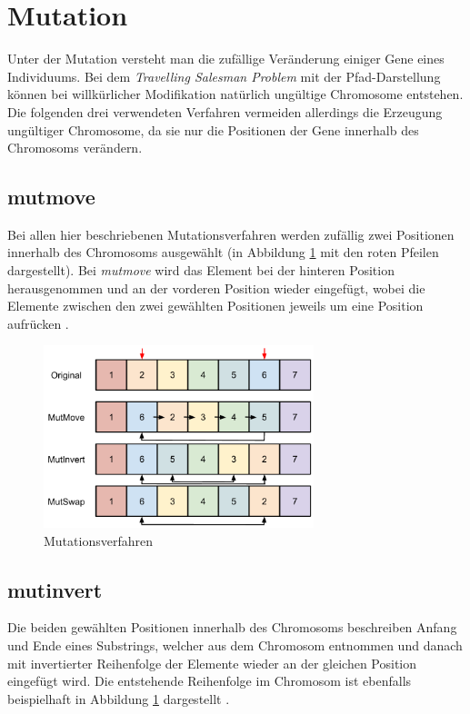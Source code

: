 \section{Mutation}\label{mutation}

Unter der Mutation versteht man die zufällige Veränderung einiger Gene eines
Individuums.
Bei dem \emph{Travelling Salesman Problem} mit der Pfad-Darstellung
können bei willkürlicher Modifikation natürlich ungültige Chromosome
entstehen.
Die folgenden drei verwendeten Verfahren vermeiden allerdings die Erzeugung
ungültiger Chromosome, da sie nur die Positionen der Gene innerhalb des
Chromosoms verändern.


\subsection{mutmove}
Bei allen hier beschriebenen Mutationsverfahren werden zufällig zwei Positionen
innerhalb des Chromosoms ausgewählt (in Abbildung \ref{fig.mutation} mit den
roten Pfeilen dargestellt).
Bei \emph{mutmove} wird das Element bei der hinteren Position herausgenommen und
an der vorderen Position wieder eingefügt, wobei die Elemente zwischen den zwei
gewählten Positionen jeweils um eine Position aufrücken \citep{mutation}.

\begin{figure}[h!]
  \centering
  \includegraphics[width=0.7\textwidth]{Figures/mutation.pdf}
  \caption{Mutationsverfahren}\label{fig.mutation}
\end{figure}


\subsection{mutinvert}
Die beiden gewählten Positionen innerhalb des Chromosoms beschreiben Anfang
und Ende eines Substrings, welcher aus dem Chromosom entnommen und danach
mit invertierter Reihenfolge der Elemente wieder an der gleichen Position
eingefügt wird.
Die entstehende Reihenfolge im Chromosom ist ebenfalls beispielhaft in Abbildung
\ref{fig.mutation} dargestellt \citep{mutation}.


